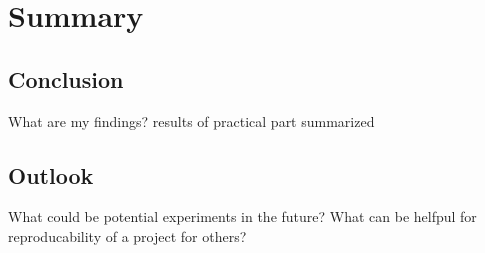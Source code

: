 \chapter{Summary}

\section{Conclusion}


What are my findings? results of practical part summarized

\section{Outlook}

What could be potential experiments in the future?
What can be helfpul for reproducability of a project for others?

